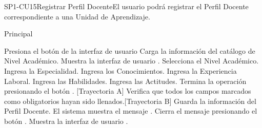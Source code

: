 \begin{UseCase}{SP1-CU15}{Registrar Perfil Docente}{El usuario podrá registrar el Perfil Docente correspondiente a una Unidad de Aprendizaje.}
\end{UseCase}

\begin{UCtrayectoria}{Principal}

    \UCpaso[\UCactor] Presiona el botón  de la interfaz de usuario 
    \UCpaso Carga la información del catálogo de Nivel Académico.
    \UCpaso Muestra la interfaz de usuario .
    \UCpaso[\UCactor] Selecciona el Nivel Académico.
    \UCpaso[\UCactor] Ingresa la Especialidad.
    \UCpaso[\UCactor] Ingresa los Conocimientos.
    \UCpaso[\UCactor] Ingresa la Experiencia Laboral.
    \UCpaso[\UCactor] Ingresa las Habilidades.
    \UCpaso[\UCactor] Ingresa las Actitudes.
    \UCpaso[\UCactor] Termina la operación presionando el botón . [Trayectoria A]
    \UCpaso Verifica que todos los campos marcados como obligatorios hayan sido llenados.[Trayectoria B]
    \UCpaso Guarda la información del Perfil Docente.
    \UCpaso El sistema muestra el mensaje .
    \UCpaso[\UCactor] Cierra el mensaje presionando el botón .
    \UCpaso Muestra la interfaz de usuario .
\end{UCtrayectoria}

